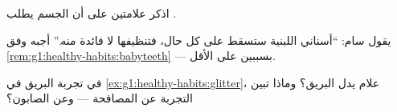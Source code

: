 \begin{exercise}[$\star$]\label{exo:g1:healthy-habits:8}
اذكر علامتين على أن الجسم يطلب .
\end{exercise}

\begin{exercise}[$\star\star$]\label{exo:g1:healthy-habits:9}
يقول سام: ``أسناني اللبنية ستسقط على كل حال، فتنظيفها لا فائدة
منه.'' أجبه وفق \cref{rem:g1:healthy-habits:babyteeth} --- بسببين
على الأقل.
\end{exercise}

\begin{exercise}[$\star\star$]\label{exo:g1:healthy-habits:10}
في تجربة البريق في \cref{ex:g1:healthy-habits:glitter}، علام يدل
البريق؟ وماذا تبين التجربة عن المصافحة --- وعن الصابون؟
\end{exercise}
